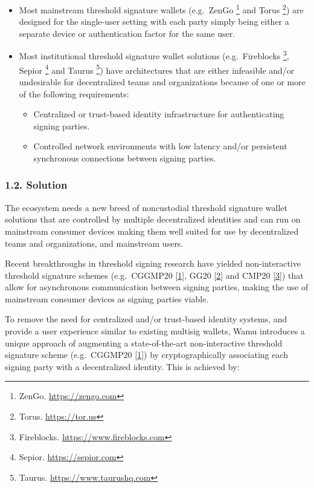\documentclass[
]{article}
\providecommand{\tightlist}{%
  \setlength{\itemsep}{0pt}\setlength{\parskip}{0pt}}
\begin{document}
\begin{itemize}
\tightlist
\item
  Most mainstream threshold signature wallets (e.g.~ZenGo \footnote{ZenGo.
    \url{https://zengo.com}} and Torus \footnote{Torus.
    \url{https://tor.us}}) are designed for the single-user setting with
  each party simply being either a separate device or authentication
  factor for the same user.
\item
  Most institutional threshold signature wallet solutions
  (e.g.~Fireblocks \footnote{Fireblocks.
    \url{https://www.fireblocks.com}}, Sepior \footnote{Sepior.
    \url{https://sepior.com}} and Taurus \footnote{Taurus.
    \url{https://www.taurushq.com}}) have architectures that are either
  infeasible and/or undesirable for decentralized teams and
  organizations because of one or more of the following requirements:

  \begin{itemize}
  \tightlist
  \item
    Centralized or trust-based identity infrastructure for
    authenticating signing parties.
  \item
    Controlled network environments with low latency and/or persistent
    synchronous connections between signing parties.
  \end{itemize}
\end{itemize}

\hypertarget{solution}{%
\subsubsection{1.2. Solution}\label{solution}}

The ecosystem needs a new breed of noncustodial threshold signature
wallet solutions that are controlled by multiple decentralized
identities and can run on mainstream consumer devices making them well
suited for use by decentralized teams and organizations, and mainstream
users.

Recent breakthroughs in threshold signing research have yielded
non-interactive threshold signature schemes (e.g.~CGGMP20
{[}\protect\hyperlink{ref-cggmp20}{1}{]}, GG20
{[}\protect\hyperlink{ref-gg20}{2}{]} and CMP20
{[}\protect\hyperlink{ref-cmp20}{3}{]}) that allow for asynchronous
communication between signing parties, making the use of mainstream
consumer devices as signing parties viable.

To remove the need for centralized and/or trust-based identity systems,
and provide a user experience similar to existing multisig wallets, Wamu
introduces a unique approach of augmenting a state-of-the-art
non-interactive threshold signature scheme (e.g.~CGGMP20
{[}\protect\hyperlink{ref-cggmp20}{1}{]}) by cryptographically
associating each signing party with a decentralized identity. This is
achieved by:
\end{document}

